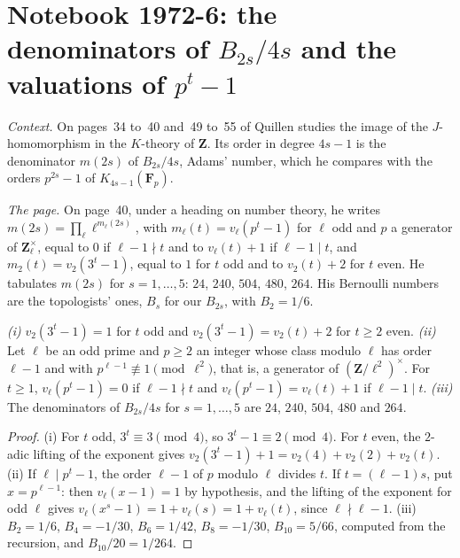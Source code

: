 \section[Notebook 1972-6: denominators of $B_{2s}/4s$]{Notebook 1972-6: the denominators of $B_{2s}/4s$ and the valuations of $p^t - 1$\protect{}}\label{sec:quillen-1972-6}

\emph{Context.} On pages~34 to~40 and~49 to~55 of  Quillen studies the image of the $J$-homomorphism in the $K$-theory of $\mathbf Z$. Its order in degree $4s - 1$ is the denominator $m(2s)$ of $B_{2s}/4s$, Adams' number, which he compares with the orders $p^{2s} - 1$ of $K_{4s-1}(\mathbf F_p)$.

\emph{The page.} On page~40, under a heading on number theory, he writes $m(2s) = \prod_\ell \ell^{m_\ell(2s)}$, with $m_\ell(t) = v_\ell(p^t - 1)$ for $\ell$ odd and $p$ a generator of $\mathbf Z_\ell^\times$, equal to $0$ if $\ell - 1 \nmid t$ and to $v_\ell(t) + 1$ if $\ell - 1 \mid t$, and $m_2(t) = v_2(3^t - 1)$, equal to $1$ for $t$ odd and to $v_2(t) + 2$ for $t$ even. He tabulates $m(2s)$ for $s = 1, \ldots, 5$: $24$, $240$, $504$, $480$, $264$. His Bernoulli numbers are the topologists' ones, $B_s$ for our $B_{2s}$, with $B_2 = 1/6$.

\begin{encadre}
\begin{theoreme}\label{thm:quillen-1972-6}
\emph{(i)} $v_2(3^t - 1) = 1$ for $t$ odd and $v_2(3^t - 1) = v_2(t) + 2$ for $t \ge 2$ even. \emph{(ii)} Let $\ell$ be an odd prime and $p \ge 2$ an integer whose class modulo $\ell$ has order $\ell - 1$ and with $p^{\ell - 1} \not\equiv 1 \pmod{\ell^2}$, that is, a generator of $(\mathbf Z/\ell^2)^\times$. For $t \ge 1$, $v_\ell(p^t - 1) = 0$ if $\ell - 1 \nmid t$ and $v_\ell(p^t - 1) = v_\ell(t) + 1$ if $\ell - 1 \mid t$. \emph{(iii)} The denominators of $B_{2s}/4s$ for $s = 1, \ldots, 5$ are $24$, $240$, $504$, $480$ and $264$.
\end{theoreme}
\end{encadre}

\begin{proof}
(i) For $t$ odd, $3^t \equiv 3 \pmod 4$, so $3^t - 1 \equiv 2 \pmod 4$. For $t$ even, the $2$-adic lifting of the exponent gives $v_2(3^t - 1) + 1 = v_2(4) + v_2(2) + v_2(t)$. (ii) If $\ell \mid p^t - 1$, the order $\ell - 1$ of $p$ modulo $\ell$ divides $t$. If $t = (\ell - 1)s$, put $x = p^{\ell - 1}$: then $v_\ell(x - 1) = 1$ by hypothesis, and the lifting of the exponent for odd $\ell$ gives $v_\ell(x^s - 1) = 1 + v_\ell(s) = 1 + v_\ell(t)$, since $\ell \nmid \ell - 1$. (iii) $B_2 = 1/6$, $B_4 = -1/30$, $B_6 = 1/42$, $B_8 = -1/30$, $B_{10} = 5/66$, computed from the recursion, and $B_{10}/20 = 1/264$.
\end{proof}

